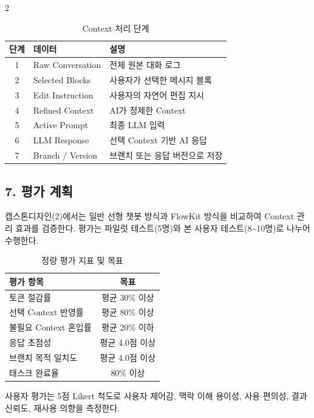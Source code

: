 \documentclass[10pt, a4paper]{article}
\begin{document}
\begin{multicols}{2}
\begin{table}[H]
\centering
\caption{Context 처리 단계}
\label{tab:stages}
\small
\begin{tabularx}{\columnwidth}{@{} c l X @{}}
\toprule
\textbf{단계} & \textbf{데이터} & \textbf{설명} \\
\midrule
1 & Raw Conversation & 전체 원본 대화 로그 \\
2 & Selected Blocks  & 사용자가 선택한 메시지 블록 \\
3 & Edit Instruction & 사용자의 자연어 편집 지시 \\
4 & Refined Context  & AI가 정제한 Context \\
5 & Active Prompt    & 최종 LLM 입력 \\
6 & LLM Response     & 선택 Context 기반 AI 응답 \\
7 & Branch / Version & 브랜치 또는 응답 버전으로 저장 \\
\bottomrule
\end{tabularx}
\end{table}

\subsection*{7. 평가 계획}

캡스톤디자인(2)에서는 일반 선형 챗봇 방식과 FlowKit 방식을 비교하여 Context 관리 효과를 검증한다. 평가는 파일럿 테스트(5명)와 본 사용자 테스트(8\textasciitilde10명)로 나누어 수행한다.

\begin{table}[H]
\centering
\caption{정량 평가 지표 및 목표}
\label{tab:metrics}
\small
\begin{tabularx}{\columnwidth}{@{} X c @{}}
\toprule
\textbf{평가 항목} & \textbf{목표} \\
\midrule
토큰 절감률          & 평균 30\% 이상 \\
선택 Context 반영률  & 평균 80\% 이상 \\
불필요 Context 혼입률 & 평균 20\% 이하 \\
응답 초점성          & 평균 4.0점 이상 \\
브랜치 목적 일치도    & 평균 4.0점 이상 \\
태스크 완료율         & 80\% 이상 \\
\bottomrule
\end{tabularx}
\end{table}

사용자 평가는 5점 Likert 척도로 사용자 제어감, 맥락 이해 용이성, 사용 편의성, 결과 신뢰도, 재사용 의향을 측정한다.


\end{multicols}
\end{document}
